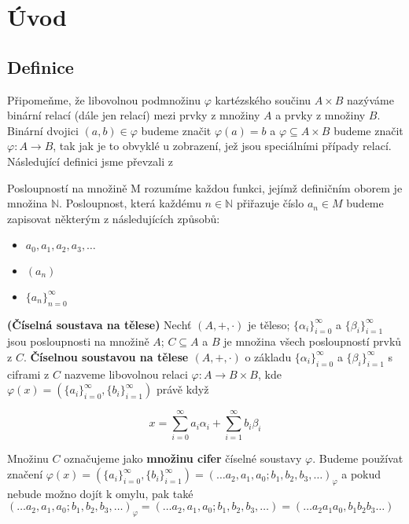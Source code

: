 \documentclass[czech,bachelor,dept470,male]{diploma}
\newcommand{\poslbeta}{\{\beta_i\}_{i=1}^{\infty}}
\newcommand{\poslalpha}{\{\alpha_i\}_{i=0}^{\infty}}
\begin{document}
	
\MakeTitlePages

\section{Úvod}
\subsection{Definice}

Připomeňme, že libovolnou podmnožinu $\varphi$ kartézského součinu $A \times B$ nazýváme binární relací (dále jen relací) mezi prvky z množiny $A$ a prvky z množiny $B$. Binární dvojici $(a,b)\in \varphi$ budeme značit $\varphi(a) = b$ a $\varphi \subseteq A \times B$ budeme značit $\varphi : A \rightarrow B$, tak jak je to obvyklé u zobrazení, jež jsou speciálními případy relací.\newline\newline
Následující definici jsme převzali z \cite{a}
\begin{definition}
	Posloupností na množině M rozumíme každou funkci, jejímž definičním oborem je množina $\mathbb{N}$. Posloupnost, která každému $n \in \mathbb{N}$ přiřazuje číslo $a_n \in M$ budeme zapisovat některým z následujících způsobů:
	\begin{itemize}
		\item $a_0, a_1, a_2, a_3,\dots$
		\item $(a_n)$
		\item $\{a_n\}_{n=0}^{\infty}$
	\end{itemize}
\end{definition}

\begin{definition}\label{d2} \textbf{(Číselná soustava na tělese)}
	Nechť $(A,+,\cdot)$ je těleso; $\poslalpha$ a $\poslbeta$ jsou posloupnosti na množině $A$; $C\subseteq A$ a $B$ je množina všech posloupností prvků z $C$.
	\textbf{Číselnou soustavou na tělese $(A,+,\cdot)$} o základu $\poslalpha$ a $\poslbeta$ s ciframi z $C$ nazveme libovolnou relaci $\varphi : A \rightarrow B\times B$, kde 	$\varphi(x)=\left(\{a_{i}\}_{i=0}^{\infty},\{b_{i}\}_{i=1}^{\infty}\right)$ právě když
	
	$$x = \sum_{i=0}^{\infty} a_{i}\alpha_{i} + \sum_{i=1}^{\infty} b_{i}\beta_{i}$$
	
	Množinu $C$ označujeme jako \textbf{množinu cifer} číselné soustavy $\varphi$. Budeme používat značení $\varphi(x) = \left(\{a_{i}\}_{i=0}^{\infty},\{b_{i}\}_{i=1}^{\infty}\right) = (\dots a_2,a_1,a_0;b_1, b_2, b_3, \dots)_{\varphi}$ a pokud nebude možno dojít k omylu, pak také $(\dots a_2,a_1,a_0;b_1, b_2, b_3, \dots)_{\varphi} = (\dots a_2,a_1,a_0;b_1, b_2, b_3, \dots) = (\dots a_2a_1a_0,b_1 b_2 b_3 \dots)$
\end{definition}
\end{document}
